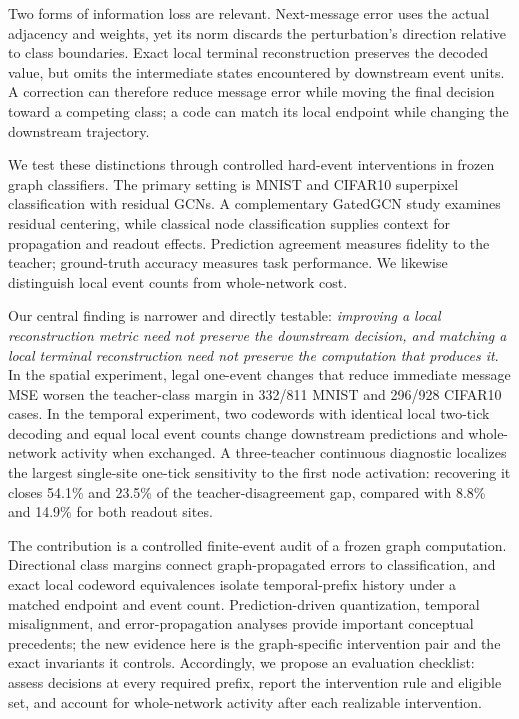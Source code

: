 \documentclass[10pt,twocolumn,letterpaper]{article}
\begin{document}
Two forms of information loss are relevant. Next-message error uses the actual adjacency and weights, yet its norm discards the perturbation's direction relative to class boundaries. Exact local terminal reconstruction preserves the decoded value, but omits the intermediate states encountered by downstream event units. A correction can therefore reduce message error while moving the final decision toward a competing class; a code can match its local endpoint while changing the downstream trajectory.

We test these distinctions through controlled hard-event interventions in frozen graph classifiers. The primary setting is MNIST and CIFAR10 superpixel classification with residual GCNs. A complementary GatedGCN study examines residual centering, while classical node classification supplies context for propagation and readout effects. Prediction agreement measures fidelity to the teacher; ground-truth accuracy measures task performance. We likewise distinguish local event counts from whole-network cost.

Our central finding is narrower and directly testable: \emph{improving a local reconstruction metric need not preserve the downstream decision, and matching a local terminal reconstruction need not preserve the computation that produces it}. In the spatial experiment, legal one-event changes that reduce immediate message MSE worsen the teacher-class margin in 332/811 MNIST and 296/928 CIFAR10 cases. In the temporal experiment, two codewords with identical local two-tick decoding and equal local event counts change downstream predictions and whole-network activity when exchanged. A three-teacher continuous diagnostic localizes the largest single-site one-tick sensitivity to the first node activation: recovering it closes 54.1\% and 23.5\% of the teacher-disagreement gap, compared with 8.8\% and 14.9\% for both readout sites.

The contribution is a controlled finite-event audit of a frozen graph computation. Directional class margins connect graph-propagated errors to classification, and exact local codeword equivalences isolate temporal-prefix history under a matched endpoint and event count. Prediction-driven quantization, temporal misalignment, and error-propagation analyses provide important conceptual precedents; the new evidence here is the graph-specific intervention pair and the exact invariants it controls. Accordingly, we propose an evaluation checklist: assess decisions at every required prefix, report the intervention rule and eligible set, and account for whole-network activity after each realizable intervention.
\end{document}

